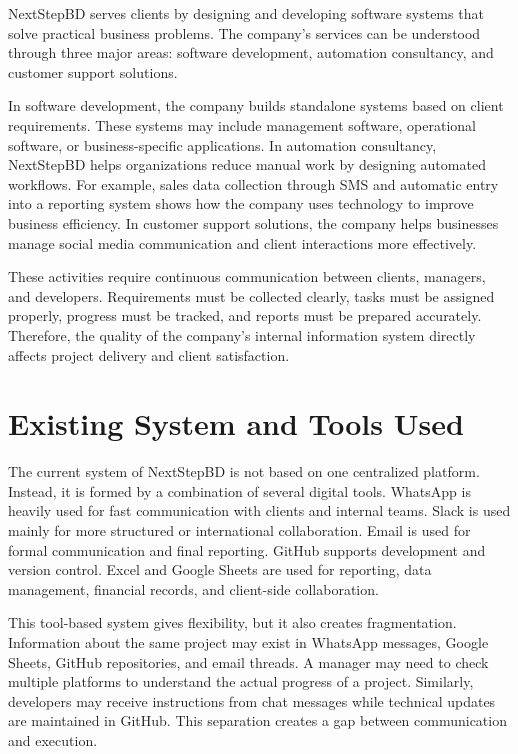 \documentclass[12pt,a4paper]{report}
\begin{document}
NextStepBD serves clients by designing and developing software systems that solve practical business problems. The company’s services can be understood through three major areas: software development, automation consultancy, and customer support solutions.

In software development, the company builds standalone systems based on client requirements. These systems may include management software, operational software, or business-specific applications. In automation consultancy, NextStepBD helps organizations reduce manual work by designing automated workflows. For example, sales data collection through SMS and automatic entry into a reporting system shows how the company uses technology to improve business efficiency. In customer support solutions, the company helps businesses manage social media communication and client interactions more effectively.

These activities require continuous communication between clients, managers, and developers. Requirements must be collected clearly, tasks must be assigned properly, progress must be tracked, and reports must be prepared accurately. Therefore, the quality of the company’s internal information system directly affects project delivery and client satisfaction.

\section{Existing System and Tools Used}

The current system of NextStepBD is not based on one centralized platform. Instead, it is formed by a combination of several digital tools. WhatsApp is heavily used for fast communication with clients and internal teams. Slack is used mainly for more structured or international collaboration. Email is used for formal communication and final reporting. GitHub supports development and version control. Excel and Google Sheets are used for reporting, data management, financial records, and client-side collaboration.

This tool-based system gives flexibility, but it also creates fragmentation. Information about the same project may exist in WhatsApp messages, Google Sheets, GitHub repositories, and email threads. A manager may need to check multiple platforms to understand the actual progress of a project. Similarly, developers may receive instructions from chat messages while technical updates are maintained in GitHub. This separation creates a gap between communication and execution.
\end{document}
